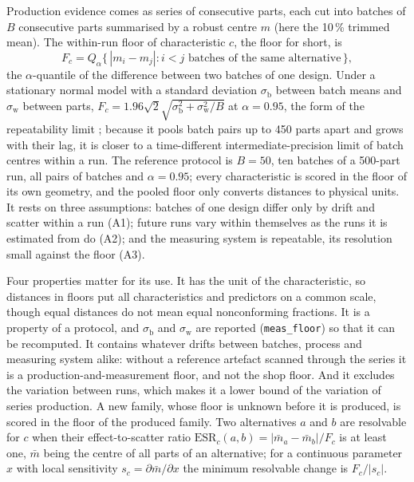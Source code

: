 \documentclass[pdflatex,sn-basic,lineno]{sn-jnl}
\newcommand{\res}[1]{\texttt{#1}}  %
\begin{document}
Production evidence comes as series of consecutive parts, each cut into batches of $B$ consecutive parts summarised by a robust centre $m$ (here the 10\,\% trimmed mean). The within-run floor of characteristic $c$, the floor for short, is
\begin{equation}
F_c = Q_\alpha\bigl\{\,|m_i - m_j| : i< j \text{ batches of the same alternative}\,\bigr\},
\label{eq:floor}
\end{equation}
the $\alpha$-quantile of the difference between two batches of one design. Under a stationary normal model with a standard deviation $\sigma_\mathrm{b}$ between batch means and $\sigma_\mathrm{w}$ between parts, $F_c = 1.96\sqrt{2}\sqrt{\sigma_\mathrm{b}^2+\sigma_\mathrm{w}^2/B}$ at $\alpha=0.95$, the form of the repeatability limit \citep{iso2025repeatability, iso1994accuracy}; because it pools batch pairs up to 450 parts apart and grows with their lag, it is closer to a time-different intermediate-precision limit \citep{iso2023intermediate} of batch centres within a run. The reference protocol is $B=50$, ten batches of a 500-part run, all pairs of batches and $\alpha=0.95$; every characteristic is scored in the floor of its own geometry, and the pooled floor only converts distances to physical units. It rests on three assumptions: batches of one design differ only by drift and scatter within a run (A1); future runs vary within themselves as the runs it is estimated from do (A2); and the measuring system is repeatable, its resolution small against the floor (A3).

Four properties matter for its use. It has the unit of the characteristic, so distances in floors put all characteristics and predictors on a common scale, though equal distances do not mean equal nonconforming fractions. It is a property of a protocol, and $\sigma_\mathrm{b}$ and $\sigma_\mathrm{w}$ are reported (\res{meas\_floor}) so that it can be recomputed. It contains whatever drifts between batches, process and measuring system alike: without a reference artefact scanned through the series it is a production-and-measurement floor, and not the shop floor. And it excludes the variation between runs, which makes it a lower bound of the variation of series production. A new family, whose floor is unknown before it is produced, is scored in the floor of the produced family. Two alternatives $a$ and $b$ are resolvable for $c$ when their effect-to-scatter ratio $\mathrm{ESR}_c(a,b) = |\bar m_a - \bar m_b|/F_c$ is at least one, $\bar m$ being the centre of all parts of an alternative; for a continuous parameter $x$ with local sensitivity $s_c=\partial\bar m/\partial x$ the minimum resolvable change is $F_c/|s_c|$.
\end{document}
